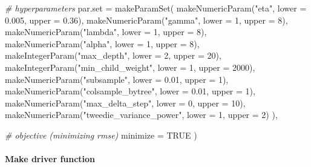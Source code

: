 \documentclass[
]{article}
\newenvironment{Shaded}{\begin{snugshade}}{\end{snugshade}}
\newcommand{\AttributeTok}[1]{\textcolor[rgb]{0.77,0.63,0.00}{#1}}
\newcommand{\CommentTok}[1]{\textcolor[rgb]{0.56,0.35,0.01}{\textit{#1}}}
\newcommand{\ConstantTok}[1]{\textcolor[rgb]{0.00,0.00,0.00}{#1}}
\newcommand{\DecValTok}[1]{\textcolor[rgb]{0.00,0.00,0.81}{#1}}
\newcommand{\FloatTok}[1]{\textcolor[rgb]{0.00,0.00,0.81}{#1}}
\newcommand{\FunctionTok}[1]{\textcolor[rgb]{0.00,0.00,0.00}{#1}}
\newcommand{\NormalTok}[1]{#1}
\newcommand{\StringTok}[1]{\textcolor[rgb]{0.31,0.60,0.02}{#1}}
\begin{document}
\begin{Shaded}
\begin{Highlighting}[]
  \CommentTok{\# hyperparameters }
  \AttributeTok{par.set =} \FunctionTok{makeParamSet}\NormalTok{(}
    \FunctionTok{makeNumericParam}\NormalTok{(}\StringTok{"eta"}\NormalTok{,                    }\AttributeTok{lower =} \FloatTok{0.005}\NormalTok{, }\AttributeTok{upper =} \FloatTok{0.36}\NormalTok{),}
    \FunctionTok{makeNumericParam}\NormalTok{(}\StringTok{"gamma"}\NormalTok{,                  }\AttributeTok{lower =} \DecValTok{1}\NormalTok{,     }\AttributeTok{upper =} \DecValTok{8}\NormalTok{),}
    \FunctionTok{makeNumericParam}\NormalTok{(}\StringTok{"lambda"}\NormalTok{,                 }\AttributeTok{lower =} \DecValTok{1}\NormalTok{,     }\AttributeTok{upper =} \DecValTok{8}\NormalTok{),}
    \FunctionTok{makeNumericParam}\NormalTok{(}\StringTok{"alpha"}\NormalTok{,                  }\AttributeTok{lower =} \DecValTok{1}\NormalTok{,     }\AttributeTok{upper =} \DecValTok{8}\NormalTok{),}
    \FunctionTok{makeIntegerParam}\NormalTok{(}\StringTok{"max\_depth"}\NormalTok{,              }\AttributeTok{lower =} \DecValTok{2}\NormalTok{,     }\AttributeTok{upper =} \DecValTok{20}\NormalTok{),}
    \FunctionTok{makeIntegerParam}\NormalTok{(}\StringTok{"min\_child\_weight"}\NormalTok{,       }\AttributeTok{lower =} \DecValTok{1}\NormalTok{,     }\AttributeTok{upper =} \DecValTok{2000}\NormalTok{),}
    \FunctionTok{makeNumericParam}\NormalTok{(}\StringTok{"subsample"}\NormalTok{,              }\AttributeTok{lower =} \FloatTok{0.01}\NormalTok{,  }\AttributeTok{upper =} \DecValTok{1}\NormalTok{),}
    \FunctionTok{makeNumericParam}\NormalTok{(}\StringTok{"colsample\_bytree"}\NormalTok{,       }\AttributeTok{lower =} \FloatTok{0.01}\NormalTok{,  }\AttributeTok{upper =} \DecValTok{1}\NormalTok{),}
    \FunctionTok{makeNumericParam}\NormalTok{(}\StringTok{"max\_delta\_step"}\NormalTok{,         }\AttributeTok{lower =} \DecValTok{0}\NormalTok{,     }\AttributeTok{upper =} \DecValTok{10}\NormalTok{),}
    \FunctionTok{makeNumericParam}\NormalTok{(}\StringTok{"tweedie\_variance\_power"}\NormalTok{, }\AttributeTok{lower =} \DecValTok{1}\NormalTok{,     }\AttributeTok{upper =} \DecValTok{2}\NormalTok{)}
\NormalTok{  ),}
  
  \CommentTok{\# objective (minimizing rmse)}
  \AttributeTok{minimize =} \ConstantTok{TRUE}
\NormalTok{)}
\end{Highlighting}
\end{Shaded}

\hypertarget{make-driver-function}{%
\paragraph{Make driver function}\label{make-driver-function}}
\end{document}
